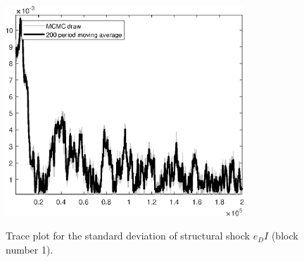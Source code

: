 \begin{figure}[H]
\centering
  \includegraphics[width=0.8\textwidth]{BRS_sectoral_rest/graphs/TracePlot_SE_e_DI_blck_1}\\
    \caption{Trace plot for the standard deviation of structural shock ${e_DI}$ (block number 1).}
\end{figure}
